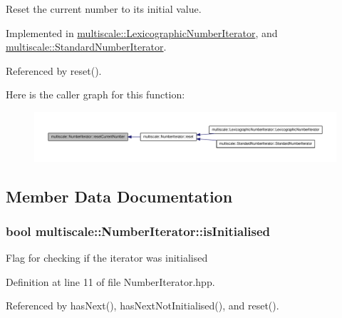 \-Reset the current number to its initial value. 



\-Implemented in \hyperlink{classmultiscale_1_1LexicographicNumberIterator_a18311f68a49156a415c817a947abcd7d}{multiscale\-::\-Lexicographic\-Number\-Iterator}, and \hyperlink{classmultiscale_1_1StandardNumberIterator_a678d43170a27106e1d8c5475b7088d9e}{multiscale\-::\-Standard\-Number\-Iterator}.



\-Referenced by reset().



\-Here is the caller graph for this function\-:
\nopagebreak
\begin{figure}[H]
\begin{center}
\leavevmode
\includegraphics[width=350pt]{classmultiscale_1_1NumberIterator_a21e658de178b6c957df5ea0482e6fbd6_icgraph}
\end{center}
\end{figure}




\subsection{\-Member \-Data \-Documentation}
\hypertarget{classmultiscale_1_1NumberIterator_ae3d929444e14677de0b616a059380f3f}{
\subsubsection[{is\-Initialised}]{\setlength{\rightskip}{0pt plus 5cm}bool {\bf multiscale\-::\-Number\-Iterator\-::is\-Initialised}}}\label{classmultiscale_1_1NumberIterator_ae3d929444e14677de0b616a059380f3f}
\-Flag for checking if the iterator was initialised 

\-Definition at line 11 of file \-Number\-Iterator.\-hpp.



\-Referenced by has\-Next(), has\-Next\-Not\-Initialised(), and reset().

